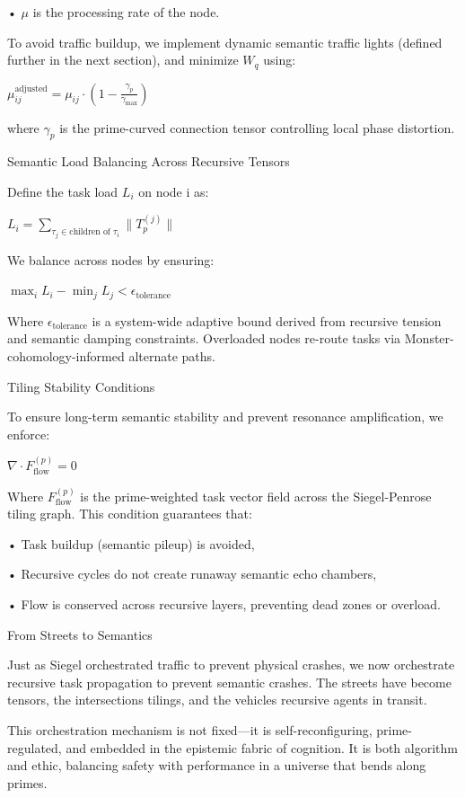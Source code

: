 \documentclass[11pt]{article}
\begin{document}
• $\mu$ is the processing rate of the node.

To avoid traffic buildup, we implement dynamic semantic traffic lights (defined further in the next section), and minimize $W_q$ using:

$\mu_{ij}^{\text{adjusted}} = \mu_{ij} \cdot \left(1 - \frac{\gamma_p}{\gamma_{\max}}\right)$

where $\gamma_p$ is the prime-curved connection tensor controlling local phase distortion.

Semantic Load Balancing Across Recursive Tensors

Define the task load $L_i$ on node i as:

$L_i = \sum_{\tau_j \in \text{children of } \tau_i} \|T_p^{(j)}\|$

We balance across nodes by ensuring:

$\max_i L_i - \min_j L_j < \epsilon_{\text{tolerance}}$

Where $\epsilon_{\text{tolerance}}$ is a system-wide adaptive bound derived from recursive tension and semantic damping constraints. Overloaded nodes re-route tasks via Monster-cohomology-informed alternate paths.

Tiling Stability Conditions

To ensure long-term semantic stability and prevent resonance amplification, we enforce:

$\nabla \cdot F_{\text{flow}}^{(p)} = 0$

Where $F_{\text{flow}}^{(p)}$ is the prime-weighted task vector field across the Siegel-Penrose tiling graph. This condition guarantees that:

• Task buildup (semantic pileup) is avoided,

• Recursive cycles do not create runaway semantic echo chambers,

• Flow is conserved across recursive layers, preventing dead zones or overload.

From Streets to Semantics

Just as Siegel orchestrated traffic to prevent physical crashes, we now orchestrate recursive task propagation to prevent semantic crashes. The streets have become tensors, the intersections tilings, and the vehicles recursive agents in transit.

This orchestration mechanism is not fixed—it is self-reconfiguring, prime-regulated, and embedded in the epistemic fabric of cognition. It is both algorithm and ethic, balancing safety with performance in a universe that bends along primes.
\end{document}

